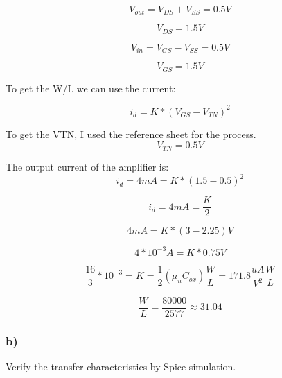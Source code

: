 \documentclass[10pt,a4paper]{article}
\begin{document}
\begin{equation}
V_{out} = V_{DS} + V_{SS}  = 0.5 V
\end{equation}

\begin{equation}
V_{DS} = 1.5 V
\end{equation}

\begin{equation}
V_{in} = V_{GS} - V_{SS} = 0.5 V
\end{equation}

\begin{equation}
V_{GS} = 1.5 V
\end{equation}

To get the W/L we can use the current:

\begin{equation}
i_{d} = K * (V_{GS} - V_{TN})^2
\end{equation}


To get the VTN, I used the reference sheet for the process. 
\begin{equation}
V_{TN} =  0.5V
\end{equation}


The output current of the amplifier is:
\begin{equation}
i_{d} = 4mA = K * (1.5 - 0.5)^2
\end{equation}

\begin{equation}
i_{d} = 4mA = \frac{K}{2}
\end{equation}

\begin{equation}
4mA = K * (3 - 2.25)V
\end{equation}

\begin{equation}
4*10^{-3} A = K * 0.75V
\end{equation}

\begin{equation}
\frac{16}{3}*10^{-3} = K = \frac{1}{2}(\mu_n C_{ox})\frac{W}{L} = 171.8 \frac{uA}{V^2} \frac{W}{L}
\end{equation}

\begin{equation}
\frac{W}{L} = \frac{80000}{2577} \approx 31.04
\end{equation}



\subsubsection*{b)}
Verify the transfer characteristics by Spice simulation.
\end{document}

